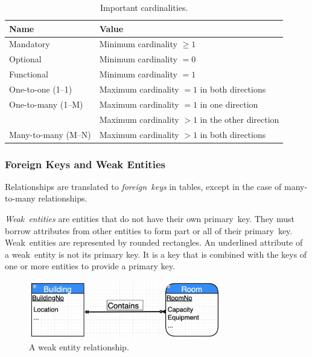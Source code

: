\begin{table}[htp]
  \centering
  \caption*{Important cardinalities.}
  \begin{tabular}{ll}
    \toprule
    Name & Value \\
    \midrule
    Mandatory & Minimum cardinality \( \geq 1 \) \\ [1ex]
    Optional & Minimum cardinality \( = 0 \) \\ [1ex]
    Functional & Minimum cardinality \( = 1 \) \\ [1ex]
    \midrule
    One-to-one (1--1) & Maximum cardinality \( = 1 \) in both directions \\ [1ex]
    One-to-many (1--M) & Maximum cardinality \( = 1 \) in one direction \\
    & Maximum cardinality \( > 1 \) in the other direction \\ [1ex]
    Many-to-many (M--N) & Maximum cardinality \( > 1 \) in both directions \\
    \bottomrule
  \end{tabular}
\end{table}

\subsubsection{Foreign Keys and Weak Entities}

Relationships are translated to \emph{foreign~keys} in tables, except in the case of many-to-many relationships.

\emph{Weak~entities} are entities that do not have their own primary~key.
They must borrow attributes from other entities to form part or all of their primary~key.
Weak~entities are represented by rounded rectangles.
An underlined attribute of a weak~entity is not its primary key.
It is a key that is combined with the keys of one or more entities to provide a primary key.

\begin{figure}[htp]
  \centering
  \includegraphics[width=0.75\textwidth]{unit-1/figures/weak-entity.jpg}
  \caption*{A weak entity relationship.}
\end{figure}

